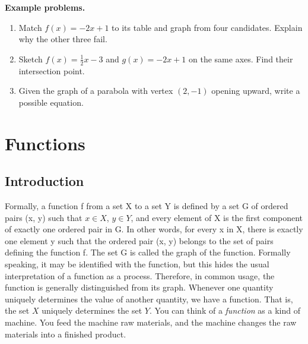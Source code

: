 \textbf{Example problems.}
\begin{enumerate}
    \item Match $f(x) = -2x + 1$ to its table and graph from four
          candidates. Explain why the other three fail.
    \item Sketch $f(x) = \frac{1}{2}x - 3$ and $g(x) = -2x + 1$ on the
          same axes. Find their intersection point.
    \item Given the graph of a parabola with vertex $(2,-1)$ opening
          upward, write a possible equation.
\end{enumerate}



\section{Functions}
\label{sec:func-0eaa}



\subsection{Introduction}
\label{sss:intr-8800}




Formally, a function f from a set X to a set Y is defined by a set G of ordered pairs (x,
y) such that $x \in X$, $y \in Y$, and every element of X is the first component of
exactly one ordered pair in G. In other words, for every x in X, there is exactly one
element y such that the ordered pair (x, y) belongs to the set of pairs defining the
function f. The set G is called the graph of the function. Formally speaking, it may be
identified with the function, but this hides the usual interpretation of a function as a
process. Therefore, in common usage, the function is generally distinguished from its
graph. Whenever one quantity uniquely determines the value of another quantity, we have
a function. That is, the set $X$ uniquely determines the set $Y$. You can think of a
\textit{function} as a kind of machine. You feed the machine raw materials, and the
machine changes the raw materials into a finished product.





